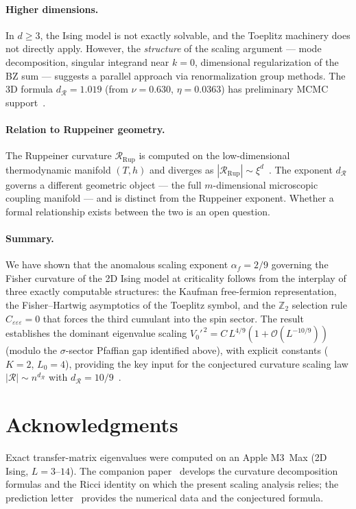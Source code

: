 \documentclass[11pt]{article}
\theoremstyle{definition}
\theoremstyle{remark}
\newcommand{\dR}{d_{\mathcal{R}}}
\newcommand{\Scal}{\mathcal{R}}
\newcommand{\cO}{\mathcal{O}}
\newcommand{\Z}{\mathbb{Z}}
\begin{document}
\paragraph{Higher dimensions.}
In $d \geq 3$, the Ising model is not exactly solvable, and the
Toeplitz machinery does not directly apply. However, the
\emph{structure} of the scaling argument
--- mode decomposition, singular integrand near $k = 0$, dimensional
regularization of the BZ sum --- suggests a parallel approach via
renormalization group methods. The 3D formula $\dR = 1.019$
(from $\nu = 0.630$, $\eta = 0.0363$) has preliminary MCMC
support~\cite{PredLetter}.

\paragraph{Relation to Ruppeiner geometry.}
The Ruppeiner curvature $\Scal_{\mathrm{Rup}}$ is computed on the
low-dimensional thermodynamic manifold $(T, h)$ and diverges as
$|\Scal_{\mathrm{Rup}}| \sim \xi^d$~\cite{Ruppeiner1979}. The
exponent $\dR$ governs a different geometric object --- the full
$m$-dimensional microscopic coupling manifold --- and is distinct
from the Ruppeiner exponent. Whether a formal relationship exists
between the two is an open question.

\paragraph{Summary.}
We have shown that the anomalous scaling exponent $\alpha_f = 2/9$
governing the Fisher curvature of the 2D Ising model at criticality
follows from the interplay of three exactly computable structures:
the Kaufman free-fermion representation, the Fisher--Hartwig
asymptotics of the Toeplitz symbol, and the $\Z_2$ selection rule
$C_{\varepsilon\varepsilon\varepsilon} = 0$ that forces the third
cumulant into the spin sector. The result establishes the dominant
eigenvalue scaling $V_0'^{\,2} = C\,L^{4/9}(1 + \cO(L^{-10/9}))$
(modulo the $\sigma$-sector Pfaffian gap identified above), with
explicit constants ($K = 2$, $L_0 = 4$), providing the key input
for the conjectured curvature scaling law
$|\Scal| \sim n^{\dR}$ with $\dR = 10/9$~\cite{PredLetter}.


\section*{Acknowledgments}
Exact transfer-matrix eigenvalues were computed on an Apple M3~Max
(2D Ising, $L = 3$--$14$). The companion paper~\cite{Paper7} develops
the curvature decomposition formulas and the Ricci identity on which the
present scaling analysis relies; the prediction letter~\cite{PredLetter}
provides the numerical data and the conjectured formula.
\end{document}
